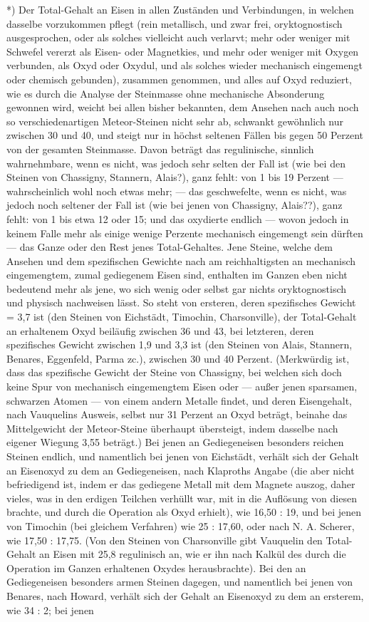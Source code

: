 \documentclass[a4paper, 11pt, oneside, german]{article}
\begin{document}
*) Der Total-Gehalt an Eisen in allen Zuständen und Verbindungen, in welchen dasselbe vorzukommen pflegt (rein metallisch, und zwar frei, oryktognostisch ausgesprochen, oder als solches vielleicht auch verlarvt; mehr oder weniger mit Schwefel vererzt als Eisen- oder Magnetkies, und mehr oder weniger mit Oxygen verbunden, als Oxyd oder Oxydul, und als solches wieder mechanisch eingemengt oder chemisch gebunden), zusammen genommen, und alles auf Oxyd reduziert, wie es durch die Analyse der Steinmasse ohne mechanische Absonderung gewonnen wird, weicht bei allen bisher bekannten, dem Ansehen nach auch noch so verschiedenartigen Meteor-Steinen nicht sehr ab, schwankt gewöhnlich nur zwischen 30 und 40, und steigt nur in höchst seltenen Fällen bis gegen 50 Perzent von der gesamten Steinmasse. Davon beträgt das regulinische, sinnlich wahrnehmbare, wenn es nicht, was jedoch sehr selten der Fall ist (wie bei den Steinen von Chassigny, Stannern, Alais?), ganz fehlt: von 1 bis 19 Perzent --- wahrscheinlich wohl noch etwas mehr; --- das geschwefelte, wenn es nicht, was jedoch noch seltener der Fall ist (wie bei jenen von Chassigny, Alais??), ganz fehlt: von 1 bis etwa 12 oder 15; und das oxydierte endlich --- wovon jedoch in keinem Falle mehr als einige wenige Perzente mechanisch eingemengt sein dürften --- das Ganze oder den Rest jenes Total-Gehaltes. Jene Steine, welche dem Ansehen und dem spezifischen Gewichte nach am reichhaltigsten an mechanisch eingemengtem, zumal gediegenem Eisen sind, enthalten im Ganzen eben nicht bedeutend mehr als jene, wo sich wenig oder selbst gar nichts oryktognostisch und physisch nachweisen lässt. So steht von ersteren, deren spezifisches Gewicht = 3,7 ist (den Steinen von Eichstädt, Timochin, Charsonville), der Total-Gehalt an erhaltenem Oxyd beiläufig zwischen 36 und 43, bei letzteren, deren spezifisches Gewicht zwischen 1,9 und 3,3 ist (den Steinen von Alais, Stannern, Benares, Eggenfeld, Parma zc.), zwischen 30 und 40 Perzent. (Merkwürdig ist, dass das spezifische Gewicht der Steine von Chassigny, bei welchen sich doch keine Spur von mechanisch eingemengtem Eisen oder --- außer jenen sparsamen, schwarzen Atomen --- von einem andern Metalle findet, und deren Eisengehalt, nach Vauquelins Ausweis, selbst nur 31 Perzent an Oxyd beträgt, beinahe das Mittelgewicht der Meteor-Steine überhaupt übersteigt, indem dasselbe nach eigener Wiegung 3,55 beträgt.) Bei jenen an Gediegeneisen besonders reichen Steinen endlich, und namentlich bei jenen von Eichstädt, verhält sich der Gehalt an Eisenoxyd zu dem an Gediegeneisen, nach Klaproths Angabe (die aber nicht befriedigend ist, indem er das gediegene Metall mit dem Magnete auszog, daher vieles, was in den erdigen Teilchen verhüllt war, mit in die Auflösung von diesen brachte, und durch die Operation als Oxyd erhielt), wie 16,50 : 19, und bei jenen von Timochin (bei gleichem Verfahren) wie 25 : 17,60, oder nach N. A. Scherer, wie 17,50 : 17,75. (Von den Steinen von Charsonville gibt Vauquelin den Total-Gehalt an Eisen mit 25,8 regulinisch an, wie er ihn nach Kalkül des durch die Operation im Ganzen erhaltenen Oxydes herausbrachte). Bei den an Gediegeneisen besonders armen Steinen dagegen, und namentlich bei jenen von Benares, nach Howard, verhält sich der Gehalt an Eisenoxyd zu dem an ersterem, wie 34 : 2; bei jenen 
\end{document}
